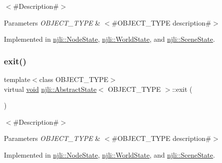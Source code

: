 $<$\#\+Description\#$>$


\begin{DoxyParams}{Parameters}
{\em O\+B\+J\+E\+C\+T\+\_\+\+T\+Y\+PE} & $<$\#\+O\+B\+J\+E\+C\+T\+\_\+\+T\+Y\+PE description\#$>$ \\
\hline
\end{DoxyParams}


Implemented in \mbox{\hyperlink{classnjli_1_1_node_state_ae2e27ccb73406c40bd502c5684bf62b0}{njli\+::\+Node\+State}}, \mbox{\hyperlink{classnjli_1_1_world_state_ad126287c45283df721b113c6a08a00f9}{njli\+::\+World\+State}}, and \mbox{\hyperlink{classnjli_1_1_scene_state_a6d0c25d933938e8542f7bd17fdaab8e0}{njli\+::\+Scene\+State}}.

\mbox{\label{classnjli_1_1_abstract_state_a75207a4c62f813d8d84168024a30c60a}} 
\subsubsection{\texorpdfstring{exit()}{exit()}}
{\footnotesize\ttfamily template$<$class O\+B\+J\+E\+C\+T\+\_\+\+T\+Y\+PE$>$ \\
virtual \mbox{\hyperlink{_thread_8h_af1e856da2e658414cb2456cb6f7ebc66}{void}} \mbox{\hyperlink{classnjli_1_1_abstract_state}{njli\+::\+Abstract\+State}}$<$ O\+B\+J\+E\+C\+T\+\_\+\+T\+Y\+PE $>$\+::exit (\begin{DoxyParamCaption}\item[{O\+B\+J\+E\+C\+T\+\_\+\+T\+Y\+PE $\ast$}]{ }\end{DoxyParamCaption})\hspace{0.3cm}{\ttfamily [pure virtual]}}

$<$\#\+Description\#$>$


\begin{DoxyParams}{Parameters}
{\em O\+B\+J\+E\+C\+T\+\_\+\+T\+Y\+PE} & $<$\#\+O\+B\+J\+E\+C\+T\+\_\+\+T\+Y\+PE description\#$>$ \\
\hline
\end{DoxyParams}


Implemented in \mbox{\hyperlink{classnjli_1_1_node_state_adbc43108aab891099b2cd9080f97a543}{njli\+::\+Node\+State}}, \mbox{\hyperlink{classnjli_1_1_world_state_a567bac6ea9dc0445e0cb7a14a8a2e271}{njli\+::\+World\+State}}, and \mbox{\hyperlink{classnjli_1_1_scene_state_ada2a116a9ed51f7e3e0a0e9e94dc7dfd}{njli\+::\+Scene\+State}}.

